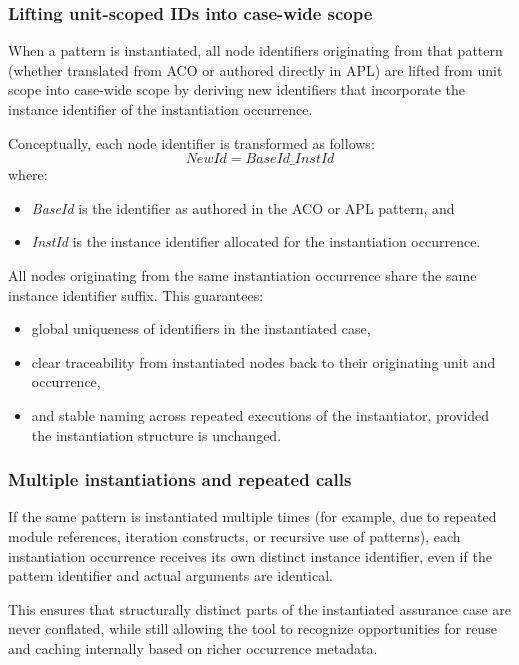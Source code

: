 \documentclass[12pt,twoside,a4paper]{article}
\begin{document}
\subsubsection{Lifting unit-scoped IDs into case-wide scope}
\label{sec:aco-id-lifting}

When a pattern is instantiated, all node identifiers originating from that pattern (whether translated from ACO or authored directly in APL) are lifted from unit scope into case-wide scope by deriving new identifiers that incorporate the instance identifier of the instantiation occurrence.

Conceptually, each node identifier is transformed as follows:
\[
\textit{NewId} = \textit{BaseId} \_ \textit{InstId}
\]
where:
\begin{itemize}
  \item \textit{BaseId} is the identifier as authored in the ACO or APL pattern, and
  \item \textit{InstId} is the instance identifier allocated for the instantiation occurrence.
\end{itemize}

All nodes originating from the same instantiation occurrence share the same instance identifier suffix. This guarantees:
\begin{itemize}
  \item global uniqueness of identifiers in the instantiated case,
  \item clear traceability from instantiated nodes back to their originating unit and occurrence,
  \item and stable naming across repeated executions of the instantiator, provided the instantiation structure is unchanged.
\end{itemize}

\subsubsection{Multiple instantiations and repeated calls}
\label{sec:aco-repeated-instantiations}

If the same pattern is instantiated multiple times (for example, due to repeated module references, iteration constructs, or recursive use of patterns), each instantiation occurrence receives its own distinct instance identifier, even if the pattern identifier and actual arguments are identical.

This ensures that structurally distinct parts of the instantiated assurance case are never conflated, while still allowing the tool to recognize opportunities for reuse and caching internally based on richer occurrence metadata.
\end{document}
